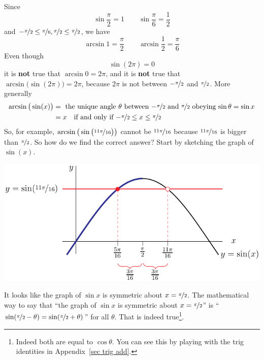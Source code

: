 \begin{eg}\label{eg:DIFFinvsin}
Since
\begin{equation*}
\sin\frac{\pi}{2}=1\qquad\sin\frac{\pi}{6}=\frac{1}{2}
\end{equation*}
and $-\nicefrac{\pi}{2}\le \nicefrac{\pi}{6},\nicefrac{\pi}{2}\le \nicefrac{\pi}{2}$,
we have
\begin{equation*}
\arcsin 1=  \frac{\pi}{2}\qquad \arcsin \frac{1}{2}=  \frac{\pi}{6}
\end{equation*}
Even though
\begin{equation*}
\sin(2\pi)=0
\end{equation*}
it is \textbf{not} true that $\arcsin 0 =2\pi$, and it is \textbf{not}
true that $\arcsin\big(\sin(2\pi)\big) =2\pi$, because $2\pi$ is not
between $-\nicefrac{\pi}{2}$ and $\nicefrac{\pi}{2}$. More generally
\begin{align*}
\arcsin\big(\sin(x)\big) &=\text{ the unique angle $\theta$ between
$-\nicefrac{\pi}{2}$ and $\nicefrac{\pi}{2}$ obeying $\sin \theta =\sin x$} \\
&= x\quad\text{if and only if $-\nicefrac{\pi}{2}\le x\le \nicefrac{\pi}{2}$}
\end{align*}
So, for example, $\arcsin\big(\sin\big(\nicefrac{11\pi}{16}\big)\big)$
cannot be $\nicefrac{11\pi}{16}$ because $\nicefrac{11\pi}{16}$ is
bigger than $\nicefrac{\pi}{2}$. So how do we find the correct answer?
Start by sketching the graph of $\sin(x)$.
\begin{efig}
\begin{center}
  \includegraphics{sinInvEg}
\end{center}
\end{efig}
It looks like the graph of $\sin x$ is symmetric about $x=\nicefrac{\pi}{2}$.
The mathematical way to say that ``the graph of $\sin x$ is symmetric about
$x=\nicefrac{\pi}{2}$'' is ``$\sin(\nicefrac{\pi}{2}-\theta)=
\sin(\nicefrac{\pi}{2}+\theta)$'' for all $\theta$. That is indeed true\footnote{Indeed
both are equal to $\cos \theta$. You can see this by playing with the trig identities in
Appendix~\ref{sec trig add}.}.



\end{eg}
